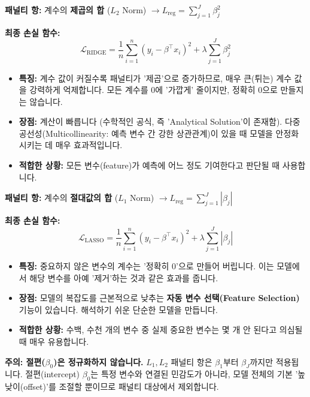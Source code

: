 \documentclass[11pt,a4paper]{book}
\theoremstyle{definition}
\begin{document}
\begin{tcolorbox}[title={1. L2 정규화: 릿지 회귀 (Ridge Regression)}]
\textbf{패널티 항:} 계수의 \textbf{제곱의 합} ($L_2$ Norm) $\rightarrow L_{\text{reg}} = \sum_{j=1}^{J} \beta_j^2$

\textbf{최종 손실 함수:}
$$
\mathcal{L}_{\text{RIDGE}} = \frac{1}{n}\sum_{i=1}^{n}(y_i - \beta^{\top}x_i)^2 + \lambda \sum_{j=1}^{J} \beta_j^2
$$

\begin{itemize}
    \item \textbf{특징:} 
        계수 값이 커질수록 패널티가 '제곱'으로 증가하므로, 매우 큰(튀는) 계수 값을 강력하게 억제합니다. 모든 계수를 0에 '가깝게' 줄이지만, 정확히 0으로 만들지는 않습니다.
    \item \textbf{장점:} 
        계산이 빠릅니다 (수학적인 공식, 즉 'Analytical Solution'이 존재함). 다중공선성(Multicollinearity: 예측 변수 간 강한 상관관계)이 있을 때 모델을 안정화시키는 데 매우 효과적입니다.
    \item \textbf{적합한 상황:} 
        모든 변수(feature)가 예측에 어느 정도 기여한다고 판단될 때 사용합니다.
\end{itemize}
\end{tcolorbox}

\begin{tcolorbox}[title={2. L1 정규화: 라쏘 회귀 (Lasso Regression)}]
\textbf{패널티 항:} 계수의 \textbf{절대값의 합} ($L_1$ Norm) $\rightarrow L_{\text{reg}} = \sum_{j=1}^{J} |\beta_j|$

\textbf{최종 손실 함수:}
$$
\mathcal{L}_{\text{LASSO}} = \frac{1}{n}\sum_{i=1}^{n}(y_i - \beta^{\top}x_i)^2 + \lambda \sum_{j=1}^{J} |\beta_j|
$$

\begin{itemize}
    \item \textbf{특징:} 
        중요하지 않은 변수의 계수는 '정확히 0'으로 만들어 버립니다. 이는 모델에서 해당 변수를 아예 '제거'하는 것과 같은 효과를 줍니다.
    \item \textbf{장점:} 
        모델의 복잡도를 근본적으로 낮추는 \textbf{자동 변수 선택(Feature Selection)} 기능이 있습니다. 해석하기 쉬운 단순한 모델을 만듭니다.
    \item \textbf{적합한 상황:} 
        수백, 수천 개의 변수 중 실제 중요한 변수는 몇 개 안 된다고 의심될 때 매우 유용합니다.
\end{itemize}
\end{tcolorbox}

\begin{warningbox}
\textbf{주의: 절편($\beta_0$)은 정규화하지 않습니다.}
$L_1, L_2$ 패널티 항은 $\beta_1$부터 $\beta_J$까지만 적용됩니다.
절편(intercept) $\beta_0$는 특정 변수와 연결된 민감도가 아니라, 모델 전체의 기본 '높낮이(offset)'를 조절할 뿐이므로 패널티 대상에서 제외합니다.
\end{warningbox}
\end{document}

